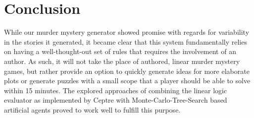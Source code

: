 \section{Conclusion} \label{conclusion}

While our murder mystery generator showed promise with regards for variability in the stories it generated, it became clear that this system fundamentally relies on having a well-thought-out set of rules that requires the involvement of an author.
As such, it will not take the place of authored, linear murder mystery games, but rather provide an option to quickly generate ideas for more elaborate plots or generate puzzles with a small scope that a player should be able to solve within 15 minutes.
The explored approaches of combining the linear logic evaluator as implemented by Ceptre with Monte-Carlo-Tree-Search based artificial agents proved to work well to fulfill this purpose.

